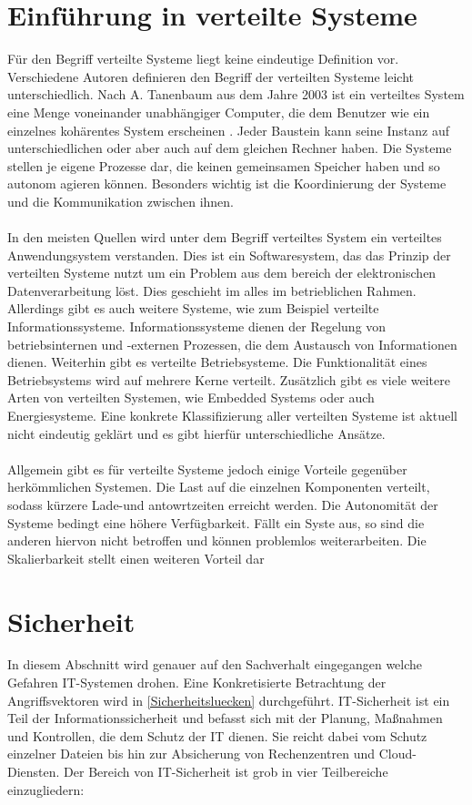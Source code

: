\section{Einführung in verteilte Systeme}\label{EinfuerungInVerteilteSysteme}

Für den Begriff \glqq verteilte Systeme \grqq{} liegt keine eindeutige Definition vor. Verschiedene Autoren definieren den Begriff der verteilten Systeme leicht unterschiedlich.
Nach A. Tanenbaum aus dem Jahre 2003 ist ein verteiltes System eine Menge voneinander unabhängiger Computer, die dem Benutzer wie ein einzelnes kohärentes System
erscheinen \cite{Mandl.2009}. Jeder Baustein kann seine Instanz auf unterschiedlichen oder aber auch auf dem gleichen Rechner haben. Die Systeme stellen je eigene Prozesse dar, die keinen gemeinsamen
Speicher haben und so autonom agieren können. Besonders wichtig ist die Koordinierung der Systeme und die Kommunikation zwischen ihnen. 
\\\\
In den meisten Quellen wird unter dem Begriff verteiltes System ein verteiltes Anwendungsystem verstanden. Dies ist ein Softwaresystem, das das Prinzip der verteilten Systeme nutzt um ein 
Problem aus dem bereich der elektronischen Datenverarbeitung löst. Dies geschieht im alles im betrieblichen Rahmen. Allerdings gibt es auch weitere Systeme, wie zum Beispiel verteilte Informationssysteme.
Informationssysteme dienen der Regelung von betriebsinternen und -externen Prozessen, die dem Austausch von Informationen dienen. Weiterhin gibt es verteilte Betriebsysteme.
Die Funktionalität eines Betriebsystems wird auf mehrere Kerne verteilt. Zusätzlich gibt es viele weitere Arten von verteilten Systemen, wie Embedded Systems oder auch Energiesysteme. Eine konkrete Klassifizierung aller verteilten Systeme ist aktuell nicht eindeutig geklärt und es gibt hierfür unterschiedliche
Ansätze.
\\\\
Allgemein gibt es für verteilte Systeme jedoch einige Vorteile gegenüber herkömmlichen Systemen. Die Last auf die einzelnen Komponenten verteilt, sodass kürzere Lade-und antowrtzeiten erreicht werden.
Die Autonomität der Systeme bedingt eine höhere Verfügbarkeit. Fällt ein Syste aus, so sind die anderen hiervon nicht betroffen und können problemlos weiterarbeiten. Die Skalierbarkeit stellt
einen weiteren Vorteil dar

\section{Sicherheit}\label{Sicherheit}
In diesem Abschnitt wird genauer auf den Sachverhalt eingegangen welche Gefahren \ac*{IT}-Systemen drohen.
Eine Konkretisierte Betrachtung der Angriffsvektoren wird in \autoref{Sicherheitsluecken} durchgeführt.
IT-Sicherheit ist ein Teil der Informationssicherheit und befasst sich mit der Planung, Maßnahmen und Kontrollen, die dem Schutz der IT dienen.
Sie reicht dabei vom Schutz einzelner Dateien bis hin zur Absicherung von Rechenzentren und Cloud-Diensten. 
Der Bereich von IT-Sicherheit ist grob in vier Teilbereiche einzugliedern: 

